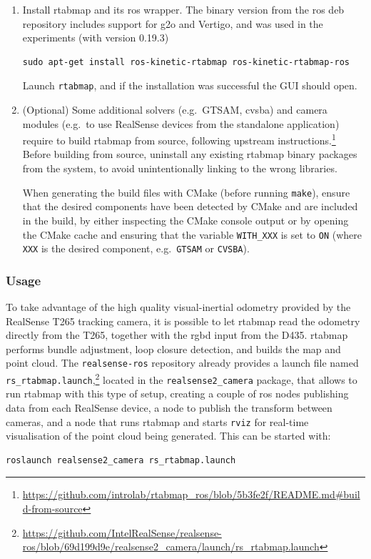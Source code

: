 \documentclass[11pt, letterpaper, twoside]{article}
\begin{document}
\begin{enumerate}
    \item Install \gls{rtabmap} and its \gls{ros} wrapper. The binary version
        from the \gls{ros} deb repository includes support for g2o and Vertigo,
        and was used in the experiments (with version 0.19.3)
\begin{Verbatim}[samepage=true]
    sudo apt-get install ros-kinetic-rtabmap ros-kinetic-rtabmap-ros
\end{Verbatim}

        Launch \texttt{rtabmap}, and if the installation was successful the GUI
        should open.

    \item (Optional) Some additional solvers (e.g.\ GTSAM, cvsba) and camera
        modules (e.g.\ to use RealSense devices from the standalone
        application) require to build \gls{rtabmap} from source, following
        upstream
        instructions.\footnote{\url{https://github.com/introlab/rtabmap_ros/blob/5b3fe2f/README.md\#build-from-source}}
        Before building from source, uninstall any existing \gls{rtabmap}
        binary packages from the system, to avoid unintentionally linking to
        the wrong libraries.

        When generating the build files with CMake (before
        running \texttt{make}), ensure that the desired components have been
        detected by CMake and are included in the build, by either inspecting
        the CMake console output or by opening the CMake cache and ensuring
        that the variable \texttt{WITH\_XXX} is set to \texttt{ON} (where
        \texttt{XXX} is the desired component, e.g.\ \texttt{GTSAM} or
        \texttt{CVSBA}).

\end{enumerate}

\subsubsection{Usage}

To take advantage of the high quality visual-inertial odometry provided by the
RealSense T265 tracking camera, it is possible to let \gls{rtabmap} read the
odometry directly from the T265, together with the \gls{rgbd} input from the
D435. \gls{rtabmap} performs bundle adjustment, loop closure detection, and
builds the map and point cloud. The \texttt{realsense-ros} repository already
provides a launch file named
\texttt{rs\_rtabmap.launch},\footnote{\url{https://github.com/IntelRealSense/realsense-ros/blob/69d199d9e/realsense2_camera/launch/rs_rtabmap.launch}}
located in the \texttt{realsense2\_camera} package, that allows to run
\gls{rtabmap} with this type of setup, creating a couple of \gls{ros}
nodes publishing data from each RealSense device, a node to publish the
transform between cameras, and a node that runs \gls{rtabmap} and starts
\texttt{rviz} for real-time visualisation of the point cloud being generated.
This can be started with:
\begin{Verbatim}[samepage=true]
    roslaunch realsense2_camera rs_rtabmap.launch
\end{Verbatim}
\end{document}
